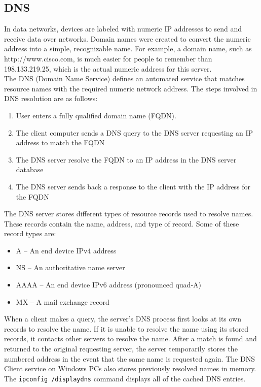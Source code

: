 \subsection{DNS}

In data networks, devices are labeled with numeric IP addresses to send and receive data over networks. Domain names were created to convert the numeric address into a simple, recognizable name. For example, a domain name, such as http://www.cisco.com, is much easier for people to remember than 198.133.219.25, which is the actual numeric address for this server. \\

The DNS (Domain Name Service)  defines an automated service that matches resource names with the required numeric network address. The steps involved in DNS resolution are as follows:

\begin{enumerate}
\item User enters a fully qualified domain name (FQDN).
\item The client computer  sends a DNS query to the DNS server requesting an IP address to match the FQDN
\item The DNS server resolve the FQDN to an IP address in the DNS server database
\item The DNS server sends back a response to the client with the IP address for the FQDN
\end{enumerate}

The DNS server stores different types of resource records used to resolve names. These records contain the name, address, and type of record. Some of these record types are:

\begin{itemize}
\item A – An end device IPv4 address
\item NS – An authoritative name server
\item AAAA – An end device IPv6 address (pronounced quad-A)
\item MX – A mail exchange record
\end{itemize}

When a client makes a query, the server's DNS process first looks at its own records to resolve the name. If it is unable to resolve the name using its stored records, it contacts other servers to resolve the name. After a match is found and returned to the original requesting server, the server temporarily stores the numbered address in the event that the same name is requested again. The DNS Client service on Windows PCs also stores previously resolved names in memory. The \verb|ipconfig /displaydns| command displays all of the cached DNS entries.\\


